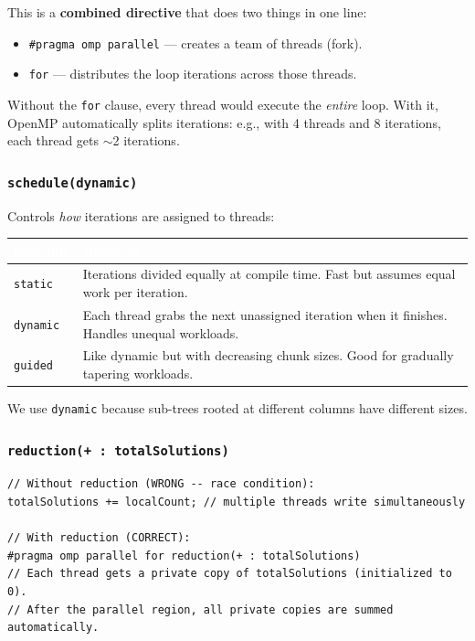 \documentclass[11pt]{article}
\begin{document}
This is a \textbf{combined directive} that does two things in one line:
\begin{itemize}
    \item \texttt{\#pragma omp parallel} --- creates a team of threads (fork).
    \item \texttt{for} --- distributes the loop iterations across those threads.
\end{itemize}
Without the \texttt{for} clause, every thread would execute the \textit{entire} loop. With it, OpenMP automatically splits iterations: e.g., with 4 threads and 8 iterations, each thread gets $\sim$2 iterations.

\subsubsection{\texttt{schedule(dynamic)}}

Controls \textit{how} iterations are assigned to threads:

\begin{center}
\sffamily\small
\begin{tabular}{@{}lp{9cm}@{}}
\toprule
\rowcolor{tableheader}
\textcolor{white}{\textbf{Schedule}} & \textcolor{white}{\textbf{Behavior}} \\
\midrule
\rowcolor{rowalt}
\texttt{static} & Iterations divided equally at compile time. Fast but assumes equal work per iteration. \\
\texttt{dynamic} & Each thread grabs the next unassigned iteration when it finishes. Handles unequal workloads. \\
\rowcolor{rowalt}
\texttt{guided} & Like dynamic but with decreasing chunk sizes. Good for gradually tapering workloads. \\
\bottomrule
\end{tabular}
\end{center}

We use \texttt{dynamic} because sub-trees rooted at different columns have different sizes.

\subsubsection{\texttt{reduction(+ : totalSolutions)}}

\begin{codebox}
\begin{lstlisting}
// Without reduction (WRONG -- race condition):
totalSolutions += localCount; // multiple threads write simultaneously

// With reduction (CORRECT):
#pragma omp parallel for reduction(+ : totalSolutions)
// Each thread gets a private copy of totalSolutions (initialized to 0).
// After the parallel region, all private copies are summed automatically.
\end{lstlisting}
\end{codebox}
\end{document}
